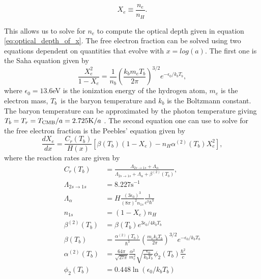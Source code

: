 \documentclass[onecolumn]{aastex62}
\begin{document}
\begin{equation}\label{eq:Xe}
    X_e\equiv\frac{n_e}{n_H}.
\end{equation}
 
This allows us to solve for $n_e$ to compute the optical depth given in equation \ref{eq:optical_depth_of_x}. The free electron fraction can be solved using two equations dependent on quantities that evolve with $x=log(a)$. The first one is the Saha equation given by
\begin{equation}\label{eq:saha_eq}
    \frac{X_e^2}{1-X_e} = \frac{1}{n_b} \left(\frac{k_bm_eT_b}{2\pi}\right)^{3/2} e^{-\epsilon_0/k_bT_b},
\end{equation}
where $\epsilon_0=13.6$eV is the ionization energy of the hydrogen atom, $m_e$ is the electron mass, $T_b$ is the baryon temperature and $k_b$ is the Boltzmann constant. The baryon temperature can be approximated by the photon temperature giving $T_b =
T_r = T_{\rm CMB} / a = 2.725 \textrm{K} / a$ \cite{WintherII:2020}. The second equation one can use to solve for the free electron fraction is the Peebles' equation given by
\begin{equation}\label{eq:peeble_eq}
    \frac{dX_e}{dx} = \frac{C_r(T_b)}{H(x)} \left[\beta(T_b)(1-X_e) - n_H\alpha^{(2)}(T_b)X_e^2\right],
\end{equation}
where the reaction rates are given by
\begin{align}
    C_r(T_b) &= \frac{\Lambda_{2s\rightarrow1s} +
    \Lambda_{\alpha}}{\Lambda_{2s\rightarrow1s} + \Lambda_{\alpha} +
    \beta^{(2)}(T_b)}, \\
    \Lambda_{2s\rightarrow1s} &= 8.227 \textrm{s}^{-1}\\
    \Lambda_{\alpha} &= H\frac{(3\epsilon_0)^3}{(8\pi)^2 n_{1s}}\frac{1}{c^3\hbar^3}\\
    n_{1s} &= (1-X_e)n_H \\
    \beta^{(2)}(T_b) &= \beta(T_b) e^{3\epsilon_0/4k_bT_b} \\
    \beta(T_b) &= \frac{\alpha^{(2)}(T_b)}{\hbar^3} \left(\frac{m_e
    k_bT_b}{2\pi}\right)^{3/2} e^{-\epsilon_0/k_bT_b} \\
    \alpha^{(2)}(T_b) &= \frac{64\pi}{\sqrt{27\pi}}
    \frac{\alpha^2}{m_e^2}\sqrt{\frac{\epsilon_0}{k_bT_b}}\phi_2(T_b)\frac{\hbar^2}{c} \\
    \phi_2(T_b) &= 0.448\ln(\epsilon_0/k_bT_b)
\end{align}
\end{document}
